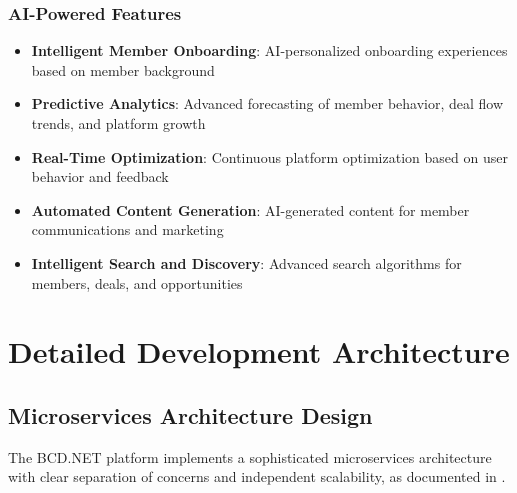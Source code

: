 \subsubsection{AI-Powered Features}

\begin{itemize}
    \item \textbf{Intelligent Member Onboarding}: AI-personalized onboarding experiences based on member background
    \item \textbf{Predictive Analytics}: Advanced forecasting of member behavior, deal flow trends, and platform growth
    \item \textbf{Real-Time Optimization}: Continuous platform optimization based on user behavior and feedback
    \item \textbf{Automated Content Generation}: AI-generated content for member communications and marketing
    \item \textbf{Intelligent Search and Discovery}: Advanced search algorithms for members, deals, and opportunities
\end{itemize}

\section{Detailed Development Architecture}

\subsection{Microservices Architecture Design}

The BCD.NET platform implements a sophisticated microservices architecture with clear separation of concerns and independent scalability, as documented in \citep{venugopal_containerized_microservices_architecture}.

